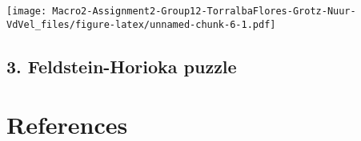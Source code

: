 \documentclass[
]{article}
\begin{document}
\texttt{[image: Macro2-Assignment2-Group12-TorralbaFlores-Grotz-Nuur-VdVel\_files/figure-latex/unnamed-chunk-6-1.pdf]}

\hypertarget{feldstein-horioka-puzzle}{%
\subsection{3. Feldstein-Horioka
puzzle}\label{feldstein-horioka-puzzle}}

\hypertarget{references}{%
\section{References}\label{references}}
\end{document}
